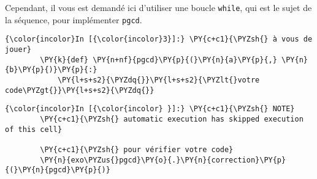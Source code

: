 Cependant, il vous est demandé ici d'utiliser une boucle \texttt{while},
qui est le sujet de la séquence, pour implémenter \texttt{pgcd}.

    \begin{Verbatim}[commandchars=\\\{\}]
{\color{incolor}In [{\color{incolor}3}]:} \PY{c+c1}{\PYZsh{} à vous de jouer}
        \PY{k}{def} \PY{n+nf}{pgcd}\PY{p}{(}\PY{n}{a}\PY{p}{,} \PY{n}{b}\PY{p}{)}\PY{p}{:}
            \PY{l+s+s2}{\PYZdq{}}\PY{l+s+s2}{\PYZlt{}votre code\PYZgt{}}\PY{l+s+s2}{\PYZdq{}}
\end{Verbatim}


    \begin{Verbatim}[commandchars=\\\{\}]
{\color{incolor}In [{\color{incolor} }]:} \PY{c+c1}{\PYZsh{} NOTE}
        \PY{c+c1}{\PYZsh{} automatic execution has skipped execution of this cell}
        
        \PY{c+c1}{\PYZsh{} pour vérifier votre code}
        \PY{n}{exo\PYZus{}pgcd}\PY{o}{.}\PY{n}{correction}\PY{p}{(}\PY{n}{pgcd}\PY{p}{)}
\end{Verbatim}



    
    
    
